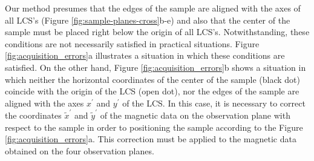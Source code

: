\documentclass[draft,gc]{agutex}
\begin{document}
\begin{article}
Our method presumes that the edges of the sample are 
aligned with the axes of all LCS's (Figure 
\ref{fig:sample-planes-cross}b-e) and also that the 
center of the sample must be placed right
below the origin of all LCS's.
Notwithstanding, these conditions are not necessarily satisfied
in practical situations.
Figure \ref{fig:acquisition_errors}a illustrates a situation
in which these conditions are satisfied.
On the other hand, Figure \ref{fig:acquisition_errors}b 
shows a situation in which neither the horizontal coordinates of 
the center of the sample (black dot) coincide with the origin of 
the LCS (open dot), nor the edges of the sample are aligned with
the axes $x^{\prime}$ and $y^{\prime}$ of the LCS.
In this case, it is necessary to correct the coordinates
$\tilde{x}^{\prime}$ and $\tilde{y}^{\prime}$ of the 
magnetic data on the observation plane with respect to the sample 
in order to positioning the sample according to the Figure
\ref{fig:acquisition_errors}a.
This correction must be applied to the
magnetic data obtained on the four observation planes.


\end{article}
\end{document}
